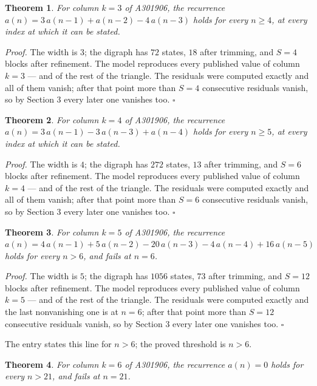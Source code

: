 \documentclass[11pt]{article}
\newtheorem{theorem}{Theorem}
\theoremstyle{definition}
\begin{document}
\begin{theorem} For column $k = 3$ of A301906, the recurrence $a(n) = 3\,a(n-1) + a(n-2) - 4\,a(n-3)$ holds for every $n \ge 4$, at every index at which it can be stated.\end{theorem}

{\itshape Proof.} The width is $3$; the digraph has $72$ states, $18$ after trimming, and $S = 4$ blocks after refinement. The model reproduces every published value of column $k = 3$ --- and of the rest of the triangle. The residuals were computed exactly and all of them vanish; after that point more than $S = 4$ consecutive residuals vanish, so by Section 3 every later one vanishes too. $\square$

\begin{theorem} For column $k = 4$ of A301906, the recurrence $a(n) = 3\,a(n-1) - 3\,a(n-3) + a(n-4)$ holds for every $n \ge 5$, at every index at which it can be stated.\end{theorem}

{\itshape Proof.} The width is $4$; the digraph has $272$ states, $13$ after trimming, and $S = 6$ blocks after refinement. The model reproduces every published value of column $k = 4$ --- and of the rest of the triangle. The residuals were computed exactly and all of them vanish; after that point more than $S = 6$ consecutive residuals vanish, so by Section 3 every later one vanishes too. $\square$

\begin{theorem} For column $k = 5$ of A301906, the recurrence $a(n) = 4\,a(n-1) + 5\,a(n-2) - 20\,a(n-3) - 4\,a(n-4) + 16\,a(n-5)$ holds for every $n > 6$, and fails at $n = 6$.\end{theorem}

{\itshape Proof.} The width is $5$; the digraph has $1056$ states, $73$ after trimming, and $S = 12$ blocks after refinement. The model reproduces every published value of column $k = 5$ --- and of the rest of the triangle. The residuals were computed exactly and the last nonvanishing one is at $n = 6$; after that point more than $S = 12$ consecutive residuals vanish, so by Section 3 every later one vanishes too. $\square$

The entry states this line for $n > 6$; the proved threshold is $n > 6$.

\begin{theorem} For column $k = 6$ of A301906, the recurrence $a(n) = 0$ holds for every $n > 21$, and fails at $n = 21$.\end{theorem}
\end{document}
